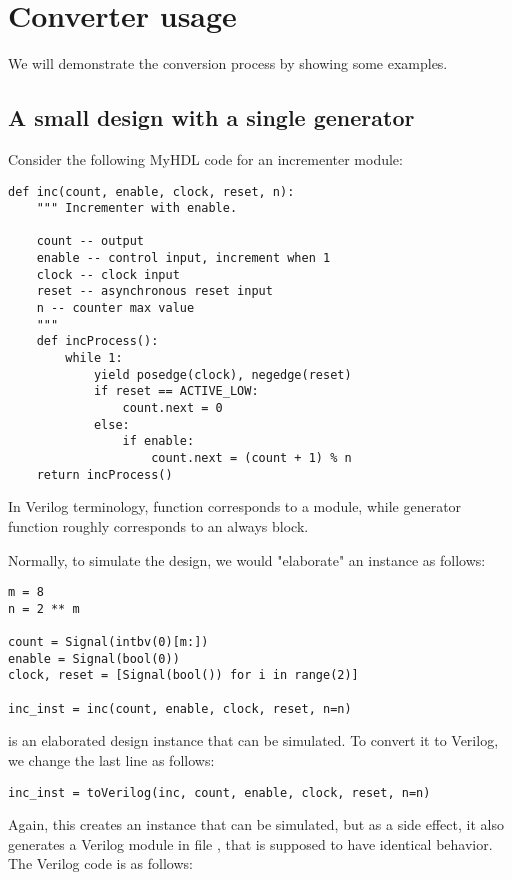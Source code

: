 \documentclass{howto}
\begin{document}
\section{Converter usage}

We will demonstrate the conversion process by showing some examples.

\subsection{A small design with a single generator}

Consider the following MyHDL code for an incrementer module:

\begin{verbatim}
def inc(count, enable, clock, reset, n):
    """ Incrementer with enable.
    
    count -- output
    enable -- control input, increment when 1
    clock -- clock input
    reset -- asynchronous reset input
    n -- counter max value
    """
    def incProcess():
        while 1:
            yield posedge(clock), negedge(reset)
            if reset == ACTIVE_LOW:
                count.next = 0
            else:
                if enable:
                    count.next = (count + 1) % n
    return incProcess()
\end{verbatim}

In Verilog terminology, function  corresponds to a
module, while generator function 
roughly corresponds to an always block.

Normally, to simulate the design, we would "elaborate" an instance
as follows:

\begin{verbatim}
m = 8
n = 2 ** m
 
count = Signal(intbv(0)[m:])
enable = Signal(bool(0))
clock, reset = [Signal(bool()) for i in range(2)]

inc_inst = inc(count, enable, clock, reset, n=n)
\end{verbatim}

 is an elaborated design instance that can be simulated. To
convert it to Verilog, we change the last line as follows:

\begin{verbatim}
inc_inst = toVerilog(inc, count, enable, clock, reset, n=n)
\end{verbatim}

Again, this creates an instance that can be simulated, but as a side
effect, it also generates a Verilog module in file ,
that is supposed to have identical behavior. The Verilog code
is as follows:
\end{document}
